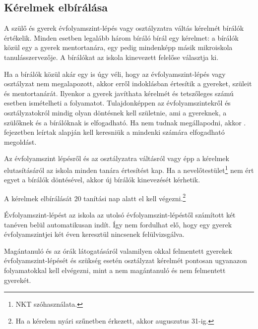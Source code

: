 
\subsection{Kérelmek elbírálása}

A szülő és gyerek évfolyamszint-lépés vagy osztályzatra váltás kérelmét bírálók
értékelik. Minden esetben legalább három bíráló bírál egy kérelmet: a
bírálók közül egy a gyerek mentortanára, egy pedig mindenképp másik mikroiskola
tanulásszervezője. A bírálókat az iskola kinevezett felelőse választja ki.

Ha a bírálók közül akár egy is úgy véli, hogy az évfolyamszint-lépés vagy
osztályzat nem megalapozott, akkor
erről indoklásban értesítik a gyereket, szüleit és mentortanárát. Ilyenkor a
gyerek javíthata kérelmét és tetszőleges számú esetben ismételheti a
folyamatot. Tulajdonképpen az évfolyamszintekről és osztályzatokról mindig
olyan döntésnek kell születnie, ami a gyereknek, a szülőknek és a bírálóknak is
elfogadható. Ha nem tudnak megállapodni, akkor
. fejezetben leírtak alapján kell keresniük a
mindenki számára elfogadható megoldást.

Az évfolyamszint lépésről és az osztályzatra váltásról vagy épp a kérelmek
elutasításáról az iskola minden tanára értesítést kap. Ha a
nevelőtestület\footnote{NKT szóhasználata.}
nem ért egyet a bírálók döntésével, akkor új bírálók kinevezését kérhetik.

A kérelmek elbírálását 20 tanítási nap alatt el kell végezni.\footnote{Ha a
    kérelem nyári szűnetben érkezett, akkor auguszutus 31-ig.}

Évfolyamszint-lépést az iskola az utolsó évfolyamszint-lépéstől számított két
tanéven belül automatikusan indít. Így nem fordulhat elő, hogy egy gyerek
évfolyamszintjei két éven keresztül nincsenek felülvizsgálva.

Magántanuló és az órák látogatásáról valamilyen okkal felmentett gyerekek
évfolyamszint-lépését és szükség esetén osztályzat kérelmét pontosan ugyanazon
folyamatokkal kell elvégezni, mint a nem magántanuló és nem felmentett
gyerekét.